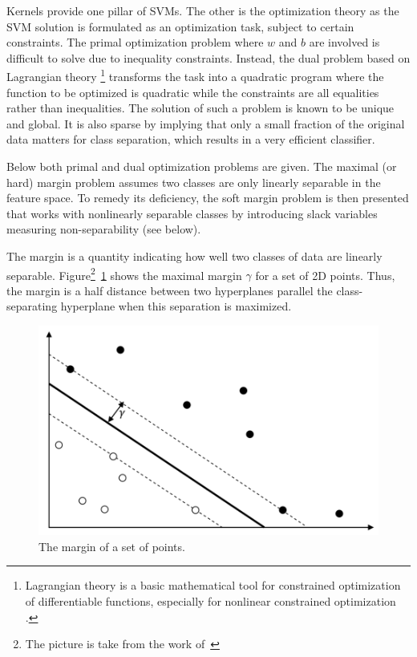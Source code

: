Kernels provide one pillar of SVMs. The other is the optimization theory as the SVM solution is formulated as an optimization task, subject to certain constraints. The primal optimization problem where \( w \) and \( b \) are involved is difficult to solve due to inequality constraints. Instead, the dual problem based on  Lagrangian theory \footnote{Lagrangian theory is a basic mathematical tool for constrained optimization of differentiable functions, especially for nonlinear constrained optimization \cite{Li:2008}.} transforms the task into a quadratic program where the function to be optimized is quadratic while the constraints are all equalities rather than inequalities. The solution of such a problem is known to be unique and global. It is also sparse by implying that only a small fraction of the original data matters for class separation, which results in a very efficient classifier.

Below both primal and dual optimization problems are given. The maximal (or hard) margin problem assumes two classes are only linearly separable in the feature space. To remedy its deficiency, the soft margin problem is then presented that works with nonlinearly separable classes by introducing slack variables measuring non-separability (see below).

The margin is a quantity indicating how well two classes of data are linearly separable. Figure\footnote{The picture is take from the work of~\cite{Okun;Valentini:2009}}~\ref{fig:hyperplane3} shows the maximal margin $\gamma$ for a set of 2D points. Thus, the margin is a half distance between two hyperplanes parallel the class-separating hyperplane when this separation is maximized.
\begin{figure}[h!]
    \centering
    \includegraphics[scale=0.6]{Graphics/svm-margins.png}
    \caption{The margin of a set of points.}
    \label{fig:hyperplane3}
\end{figure}

